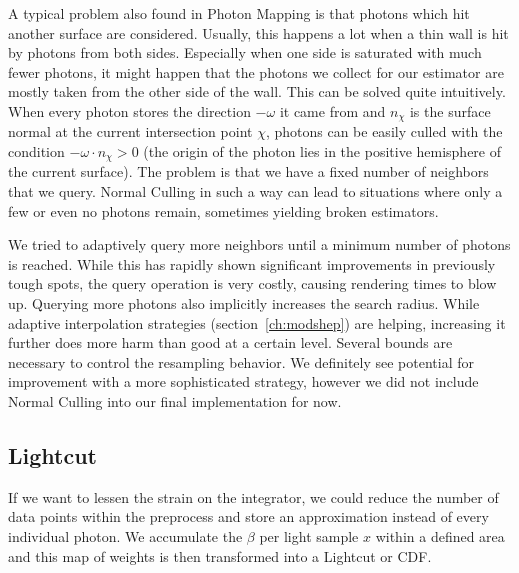 A typical problem also found in Photon Mapping is that photons which hit another surface are considered. Usually, this happens a lot when a thin wall is hit by photons from both sides. Especially when one side is saturated with much fewer photons, it might happen that the photons we collect for our estimator are mostly taken from the other side of the wall. This can be solved quite intuitively. When every photon stores the direction $-\omega$ it came from and $n_{\chi}$ is the surface normal at the current intersection point $\chi$, photons can be easily culled with the condition $-\omega\cdot n_{\chi} > 0$ (the origin of the photon lies in the positive hemisphere of the current surface). The problem is that we have a fixed number of neighbors that we query. Normal Culling in such a way can lead to situations where only a few or even no photons remain, sometimes yielding broken estimators.

We tried to adaptively query more neighbors until a minimum number of photons is reached. While this has rapidly shown significant improvements in previously tough spots, the query operation is very costly, causing rendering times to blow up. Querying more photons also implicitly increases the search radius. While adaptive interpolation strategies (section~\ref{ch:modshep}) are helping, increasing it further does more harm than good at a certain level. Several bounds are necessary to control the resampling behavior. We definitely see potential for improvement with a more sophisticated strategy, however we did not include Normal Culling into our final implementation for now.

\subsection{Lightcut}
\label{sec:lightcutd}
If we want to lessen the strain on the integrator, we could reduce the number of data points within the preprocess and store an approximation instead of every individual photon. We accumulate the $\beta$ per light sample $x$ within a defined area and this map of weights is then transformed into a Lightcut or CDF.

